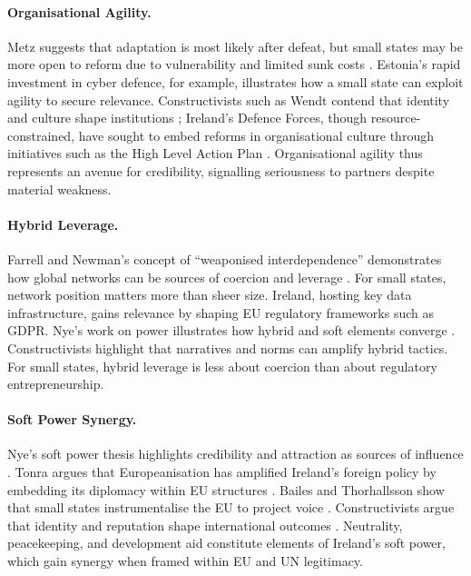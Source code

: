 \paragraph{Organisational Agility.}  
Metz suggests that adaptation is most likely after defeat, but small states may be more open to reform due to vulnerability and limited sunk costs \parencite{METZ_2007}. Estonia’s rapid investment in cyber defence, for example, illustrates how a small state can exploit agility to secure relevance. Constructivists such as Wendt contend that identity and culture shape institutions \parencite{WENDT_1999}; Ireland’s Defence Forces, though resource-constrained, have sought to embed reforms in organisational culture through initiatives such as the High Level Action Plan \parencite{HLAP_2022}. Organisational agility thus represents an avenue for credibility, signalling seriousness to partners despite material weakness.

\paragraph{Hybrid Leverage.}  
Farrell and Newman’s concept of “weaponised interdependence” demonstrates how global networks can be sources of coercion and leverage \parencite{FARRELL_2019}. For small states, network position matters more than sheer size. Ireland, hosting key data infrastructure, gains relevance by shaping EU regulatory frameworks such as GDPR. Nye’s work on power illustrates how hybrid and soft elements converge \parencite{NYE_2008}. Constructivists highlight that narratives and norms can amplify hybrid tactics. For small states, hybrid leverage is less about coercion than about regulatory entrepreneurship.

\paragraph{Soft Power Synergy.}  
Nye’s soft power thesis highlights credibility and attraction as sources of influence \parencite{NYE_2008}. Tonra argues that Europeanisation has amplified Ireland’s foreign policy by embedding its diplomacy within EU structures \parencite{TONRA_1999}. Bailes and Thorhallsson show that small states instrumentalise the EU to project voice \parencite{BAILES_2012}. Constructivists argue that identity and reputation shape international outcomes \parencite{BAILES_2013}. Neutrality, peacekeeping, and development aid constitute elements of Ireland’s soft power, which gain synergy when framed within EU and UN legitimacy.

